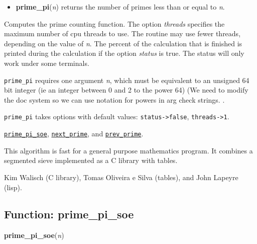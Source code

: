 \documentclass[]{article}
\begin{document}
\vspace{5 pt}
\begin{itemize}
\item[] {\bf prime\_pi}({\it n})
  returns the number of primes less than or equal to {\it n}. 

\end{itemize}
Computes the prime counting function. The option {\it threads} specifies the maximum number of cpu threads to use. The routine may use fewer threads, depending on the value of {\it n}. The percent of the calculation that is finished is printed during the calculation if the option {\it status} is 
true. The status will only work under some terminals. 

\vspace{5 pt}

   {\tt prime\_pi} requires one argument {\it n}, which must be equivalent to an unsigned 64 bit integer
 (ie an integer between 0 and 2 to the power 64)
(We need to modify the doc system so we can use notation for powers in arg check strings.
.


\vspace{5 pt}

{\tt prime\_pi} takes options with default values: {\tt status->false}, {\tt threads->1}.
\vspace{5 pt}


  \hyperlink{prime_pi_soe}{{\tt prime\_pi\_soe}}, \hyperlink{next_prime}{{\tt next\_prime}}, and \hyperlink{prev_prime}{{\tt prev\_prime}}.

\vspace{5 pt}


This algorithm is fast for a general purpose mathematics program. It combines a segmented sieve implemented as a C library with tables. 

\vspace{5 pt}


 Kim Walisch (C library), Tomas Oliveira e Silva (tables), and John Lapeyre (lisp).

\vspace{5 pt}


\subsection{Function: prime\_pi\_soe\label{sec:prime_pi_soe}}
\hypertarget{prime_pi_soe}{}
{\bf prime\_pi\_soe}({\it n})
\end{document}
